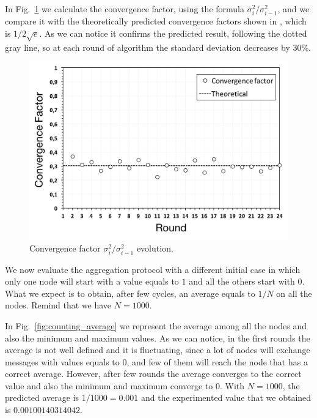 In Fig.~\ref{fig:aggregation_conv_factor} we calculate the convergence factor, using the formula $\sigma_i^2 / \sigma_{i-1}^2$, and we compare it with the theoretically predicted convergence factors shown in \cite{aggregation}, which is $1 / 2\sqrt{e}$. As we can notice it confirms the predicted result, following the dotted gray line, so at each round of algorithm the standard deviation decreases by 30\%.

\begin{figure}[ht]
  \centering
  \includegraphics[keepaspectratio=true, width=\textwidth]{images/aggregation_conv_factor}\caption{Convergence factor $\sigma_i^2 / \sigma_{i-1}^2$ evolution.}
  \label{fig:aggregation_conv_factor}
\end{figure}


\newpage
We now evaluate the aggregation protocol with a different initial case in which only one node will start with a value equals to $1$ and all the others start with $0$. What we expect is to obtain, after few cycles, an average equals to $1/N$ on all the nodes. Remind that we have $N = 1000$.

In Fig.~\ref{fig:counting_average} we represent the average among all the nodes and also the minimum and maximum values. As we can notice, in the first rounds the average is not well defined and it is fluctuating, since a lot of nodes will exchange messages with values equals to 0, and few of them will reach the node that has a correct average. However, after few rounds the average converges to the correct value and also the minimum and maximum converge to $0$. With $N = 1000$, the predicted average is $1 / 1000 = 0.001$ and the experimented value that we obtained is $0.00100140314042$.


